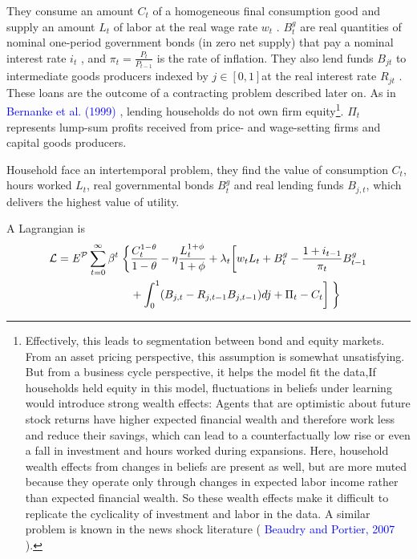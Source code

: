 \documentclass[10pt,math=newtx,citestyle=gb7714-2015,bibstyle=gb7714-2015]{elegantbook}
\begin{document}
{{{	They consume an amount $C_t$ of a homogeneous final consumption good and supply an amount $L_t$ of labor at the real wage rate $w _t$ . $B^ g_ t$ are real quantities of nominal one-period government bonds (in zero net supply) that pay a nominal interest rate $i_ t$ , and $\pi_t=\frac{P_t}{P_{t-1}}$ is the rate of inflation. They also lend funds $B_{ jt}$ to intermediate goods producers indexed by $j \in [0, 1] $at the real interest rate $R _{jt}$ . These loans are the outcome of a contracting problem described later on. As in \textcolor{blue}{Bernanke et al. (1999)} , lending households do not own firm equity\footnote{Effectively, this leads to segmentation between bond and equity markets. From an asset pricing perspective, this assumption is somewhat unsatisfying. But from a business cycle perspective, it helps the model fit the data,If households held equity in this model, 
		fluctuations in beliefs under learning would introduce strong wealth effects: Agents that are optimistic about future stock returns have higher expected financial wealth and therefore work less and reduce their savings, which can lead to a counterfactually low rise or even a fall in investment and hours worked during expansions. Here, household wealth effects from changes in beliefs are present as well, but are more muted because they operate only through changes in expected labor income rather than expected financial wealth. So these wealth effects make it difficult to replicate the cyclicality of investment and labor in the data. A similar problem is known in the news shock literature ( \textcolor{blue}{Beaudry and Portier, 2007} ).}. $\Pi_t$ represents lump-sum profits received from price- and wage-setting firms and capital goods producers. 
	
	
	Household face an intertemporal problem, they find the value of consumption $C_t$, hours worked $L_t$,  real governmental bonds $B_{t}^g$ and real lending funds $B_{j,t}$, which delivers the highest value of utility. 
	
	A Lagrangian is
	\begin{equation*}
		\begin{aligned}
			\mathcal{L}=\mathit{E}^{\mathcal{P}} \sum_{t=0}^{\infty}\beta^t\biggm\{&\frac{C_{t}^{1-\theta}}{1-\theta}-\eta \frac{L_{t}^{1+\phi}}{1+\phi}+\lambda_t\bigg[w_tL_t+B_t^g-\frac{1+i_{t-1}}{\pi_t}B_{t-1}^g\\
			&+\int_0^1(B_{j,t}-R_{j,t-1}B_{j,t-1})dj+\Pi_t-C_t\bigg]\biggm\}
		\end{aligned}
	\end{equation*}
	
}}}
\end{document}
